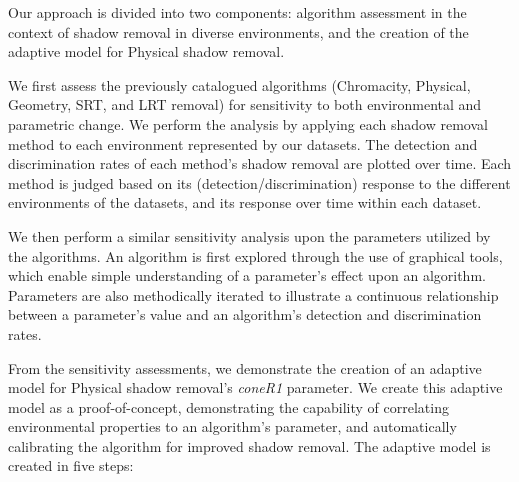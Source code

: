 Our approach is divided into two components: algorithm assessment in the context of shadow removal in diverse environments, and the creation of the adaptive model for Physical shadow removal.

We first assess the previously catalogued algorithms (Chromacity, Physical, Geometry, SRT, and LRT removal) for sensitivity to both environmental and parametric change. We perform the analysis by applying each shadow removal method to each  environment represented by our datasets. The detection and discrimination rates of each method's shadow removal are plotted over time. Each method is judged based on its (detection/discrimination) response to the different environments of the datasets, and its response over time within each dataset.

We then perform a similar sensitivity analysis upon the parameters utilized by the algorithms. An algorithm is first explored through the use of graphical tools, which enable simple understanding of a parameter's effect upon an algorithm. Parameters are also methodically iterated to illustrate a continuous relationship between a parameter's value and an algorithm's detection and discrimination rates.

From the sensitivity assessments, we demonstrate the creation of an adaptive model for Physical shadow removal's \textit{coneR1} parameter. We create this adaptive model as a proof-of-concept, demonstrating the capability of correlating environmental properties to an algorithm's parameter, and automatically calibrating the algorithm for improved shadow removal. The adaptive model is created in five steps:


